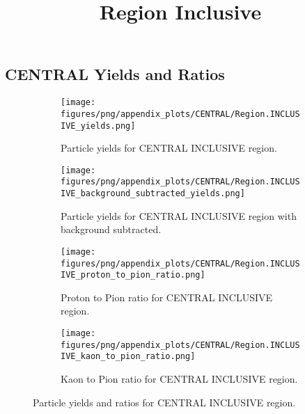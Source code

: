                 \subsection{CENTRAL Yields and Ratios}
                \begin{figure}[H]
                    \title{Region Inclusive}
                    \begin{subfigure}[b]{0.5\textwidth}
                        \centering
                        \texttt{[image: figures/png/appendix\_plots/CENTRAL/Region.INCLUSIVE\_yields.png]}
                        \caption{Particle yields for CENTRAL INCLUSIVE region.}
                        \label{fig:appendix_CENTRAL_INCLUSIVE_Inclusive_Yields}
                    \end{subfigure}
                    \begin{subfigure}[b]{0.5\textwidth}
                        \centering
                        \texttt{[image: figures/png/appendix\_plots/CENTRAL/Region.INCLUSIVE\_background\_subtracted\_yields.png]}
                        \caption{Particle yields for CENTRAL INCLUSIVE region with background subtracted.}
                        \label{fig:appendix_CENTRAL_INCLUSIVE_Inclusive_Yields_Background_Subtracted}
                    \end{subfigure}
                    \begin{subfigure}[b]{0.5\textwidth}
                        \centering
                        \texttt{[image: figures/png/appendix\_plots/CENTRAL/Region.INCLUSIVE\_proton\_to\_pion\_ratio.png]}
                        \caption{Proton to Pion ratio for CENTRAL INCLUSIVE region.}
                        \label{fig:appendix_CENTRAL_INCLUSIVE_Proton_to_Pion_Ratio}
                    \end{subfigure}
                    \begin{subfigure}[b]{0.5\textwidth}
                        \centering
                        \texttt{[image: figures/png/appendix\_plots/CENTRAL/Region.INCLUSIVE\_kaon\_to\_pion\_ratio.png]}
                        \caption{Kaon to Pion ratio for CENTRAL INCLUSIVE region.}
                        \label{fig:appendix_CENTRAL_INCLUSIVE_Kaon_to_Pion_Ratio}
                    \end{subfigure}
                    \caption{Particle yields and ratios for CENTRAL INCLUSIVE region.}
                    \label{fig:appendix_CENTRAL_INCLUSIVE_Inclusive_Yields_and_Ratios}
                \end{figure}
